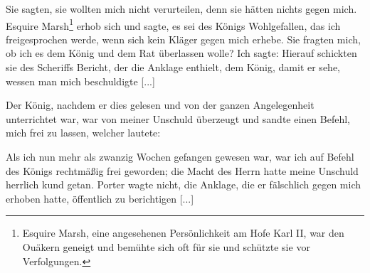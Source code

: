 Sie sagten, sie wollten mich nicht verurteilen, denn sie hätten
nichts gegen mich. Esquire Marsh\footnote{Esquire Marsh, eine 
angesehenen Persönlichkeit am Hofe Karl II, war den
Ouäkern geneigt und bemühte sich oft für sie und schützte sie vor 
Verfolgungen.} erhob sich und sagte, es sei
des Königs Wohlgefallen, das ich freigesprochen werde, wenn sich
kein Kläger gegen mich erhebe. Sie fragten mich, ob ich es dem
König und dem Rat überlassen wolle? Ich sagte: 
Hierauf schickten sie des Scheriffs Bericht, der die Anklage enthielt,
dem König, damit er sehe, wessen man mich beschuldigte [...]

Der König, nachdem er dies gelesen und von der ganzen
Angelegenheit unterrichtet war, war von meiner Unschuld überzeugt 
und sandte einen Befehl, mich frei zu lassen, welcher lautete:


Als ich nun mehr als zwanzig Wochen gefangen gewesen
war, war ich auf Befehl des Königs rechtmäßig frei geworden;
die Macht des Herrn hatte meine Unschuld herrlich kund getan.
Porter wagte nicht, die Anklage, die er fälschlich gegen mich
erhoben hatte, öffentlich zu berichtigen [...]


